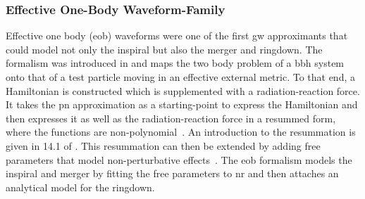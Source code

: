 \subsubsection{Effective One-Body Waveform-Family}
Effective one body (\acrshort{eob}) waveforms were one of the first \acrshort{gw} approximants that could model not only the inspiral but also the merger and ringdown. The formalism was introduced in \cite{Buonanno:1998gg} and maps the two body problem of a \acrshort{bbh} system onto that of a test particle moving in an effective external metric. To that end, a Hamiltonian is constructed which is supplemented with a radiation-reaction force. It takes the \acrshort{pn} approximation as a starting-point to express the Hamiltonian and then expresses it as well as the radiation-reaction force in a resummed form, where the functions are non-polynomial~\cite{Damour:2008te}. An introduction to the resummation is given in 14.1 of \cite{Maggiore:2018aaa}. This resummation can then be extended by adding free parameters that model non-perturbative effects~\cite{Damour:2001tu, Damour:2002vi, Damour:2007xr}. The \acrshort{eob} formalism models the inspiral and merger by fitting the free parameters to \acrshort{nr} and then attaches an analytical model for the ringdown.

